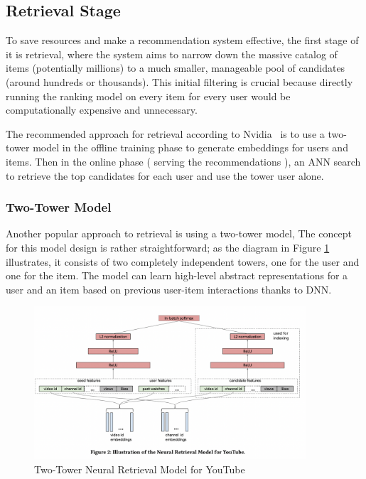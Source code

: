 \subsection{Retrieval Stage}

To save resources and make a recommendation system effective, the first stage of it is retrieval, 
where the system aims to narrow down the massive 
catalog of items (potentially millions) to a much smaller, 
manageable pool of candidates (around hundreds or thousands).
This initial filtering is crucial because 
directly running the ranking model on every item for every 
user would be computationally expensive and unnecessary.

The recommended approach for retrieval according to Nvidia~\cite{NvidiaFeatureStores} is to use a two-tower model in the offline training phase to generate embeddings for users and items.
Then in the online phase ( serving the recommendations ), an ANN search to retrieve the top candidates for each user and use the tower user alone.

\subsubsection{Two-Tower Model}

Another popular approach to retrieval is using a two-tower model, 
The concept for this model design is rather straightforward; as the diagram in Figure \ref{fig: TwoTowerModel} illustrates, it consists of two completely independent towers, 
one for the user and one for the item. 
The model can learn high-level abstract representations for a user and an item 
based on previous user-item interactions thanks to DNN. 

\begin{figure}[H]
    \centering
    \includegraphics[width=0.9\textwidth]{assets/two_tower.png}
    \caption[Two-Tower Neural Retrieval Model for YouTube]{Two-Tower Neural Retrieval Model for YouTube~\cite{YoutubeTwoTower}}
    \label{fig: TwoTowerModel}
\end{figure}

